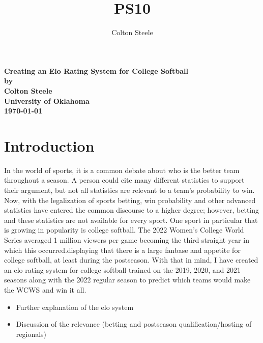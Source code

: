 \documentclass{article}
\title{PS10}
\author{Colton Steele}
\begin{document}
\begin{titlepage}
    \centering
    \vspace*{6cm}
    \textbf{\LARGE Creating an Elo Rating System for College Softball}\\
    \textbf{\large by}\\
    \textbf{\Large Colton Steele}\\
    \vspace{1cm}
    \textbf{\large University of Oklahoma}\\
    \textbf{\large \today}\\
\end{titlepage}


\section{\textbf{Introduction}}
In the world of sports, it is a common debate about who is the better team throughout a season. A person could cite many different statistics to support their argument, but not all statistics are relevant to a team’s probability to win. Now, with the legalization of sports betting, win probability and other advanced statistics have entered the common discourse to a higher degree; however, betting and these statistics are not available for every sport. One sport in particular that is growing in popularity is college softball. The 2022 Women’s College World Series averaged 1 million viewers per game becoming the third straight year in which this occurred\citet{extrainningsb}.displaying that there is a large fanbase and appetite for college softball, at least during the postseason. With that in mind, I have created an elo rating system for college softball trained on the 2019, 2020, and 2021 seasons along with the 2022 regular season to predict which teams would make the WCWS and win it all. 
\begin{itemize}
    \item Further explanation of the elo system
    \item Discussion of the relevance (betting and postseason qualification/hosting of regionals)
\end{itemize}
\end{document}
